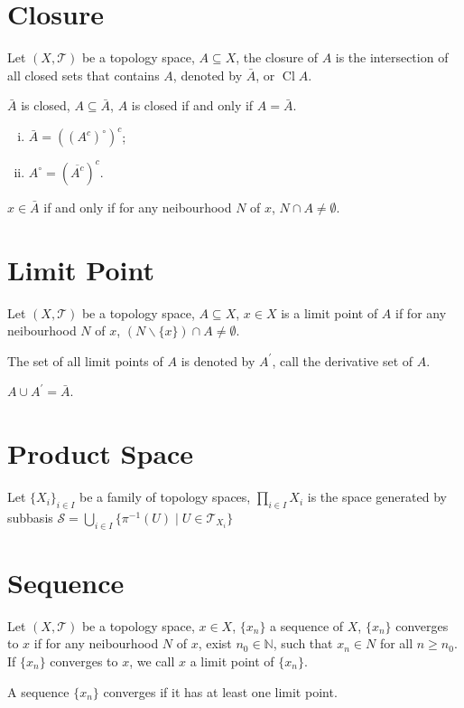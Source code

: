 \section{Closure}
\begin{defi}
Let $(X, \mathcal{T})$ be a topology space, $A \subseteq X$,
the closure of $A$ is the intersection of all closed sets that contains $A$,
denoted by $\bar A$, or $\mathop{\mathrm{Cl}} A$.
\end{defi}
$\bar A$ is closed, $A \subseteq \bar A$, $A$ is closed if and only if $A = \bar A$.
\begin{pro}
\begin{enumerate}[i).]
\item $\bar A = ((A^c)^\circ)^c$;
\item $A^\circ = (\overline{A^c})^c$.
\end{enumerate}
\end{pro}
\begin{pro}
$x \in \bar A$ if and only if for any neibourhood $N$ of $x$, $N \cap A \neq \emptyset$.
\end{pro}


\section{Limit Point}
\begin{defi}
Let $(X, \mathcal{T})$ be a topology space, $A \subseteq X$,
$x \in X$ is a limit point of $A$ if for any neibourhood $N$ of $x$,
$(N \backslash \{x\}) \cap A \neq \emptyset$.
\end{defi}
The set of all limit points of $A$ is denoted by $A^\prime$,
call the derivative set of $A$.
\begin{pro}
$A \cup A^\prime = \bar A$.
\end{pro}


\section{Product Space}
\begin{defi}
Let $\{X_i\}_{i \in I}$ be a family of topology spaces,
$\prod_{i \in I} X_i$ is the space generated by subbasis
$\mathcal{S} = \bigcup_{i \in I} \{\pi^{-1}(U) \mid U \in \mathcal{T}_{X_i}\}$
\end{defi}


\section{Sequence}
\begin{defi}
Let $(X, \mathcal{T})$ be a topology space, $x \in X$,
$\{x_n\}$ a sequence of $X$, $\{x_n\}$ converges to $x$
if for any neibourhood $N$ of $x$, exist $n_0 \in \mathbb{N}$,
such that $x_n \in N$ for all $n \geq n_0$.
If $\{x_n\}$ converges to $x$, we call $x$ a limit point of $\{x_n\}$.
\end{defi}
\begin{defi}
A sequence $\{x_n\}$ converges if it has at least one limit point.
\end{defi}
\begin{pro}
\end{pro}


